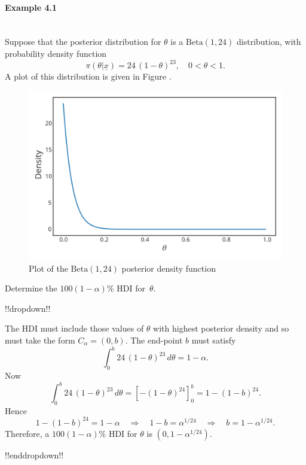 \paragraph{Example 4.1}{~\\
Suppose that the posterior distribution for $\theta$ is a
$\mathrm{Beta}(1,24)$ distribution, with probability density function
$$
\pi(\theta|\underline{x})=24\,(1-\theta)^{23}, \quad 0<\theta<1.
$$
A plot of this distribution is given in Figure .
\begin{figure}[h!]

\includegraphics{images/betaposterior.svg}
\caption{Plot of the $\mathrm{Beta}(1,24)$ posterior density function}


\end{figure}
Determine the $100(1-\alpha)\%$ HDI for~$\theta$.



!!dropdown!!

The HDI must include those values of $\theta$ with highest
    posterior density and so must take the form $C_\alpha=(0,b)$. The
    end-point $b$ must satisfy
    \begin{equation*}
    \int_0^b 24\,(1-\theta)^{23}\,d\theta = 1-\alpha.
    \end{equation*}
    Now
    \begin{equation*}
    \int_0^b 24\,(1-\theta)^{23}\,d\theta 
    = \left[-(1-\theta)^{24}\right]^b_0 = 1-(1-b)^{24}.
    \end{equation*}
    Hence
    $$
    1-(1-b)^{24}=1-\alpha \quad\Longrightarrow \quad 1-b=\alpha^{1/24}
    \quad\Longrightarrow \quad b=1-\alpha^{1/24}.
    $$
    Therefore, a $100(1-\alpha)\%$ HDI for $\theta$ is
    $(0,1-\alpha^{1/24})$.

!!enddropdown!!}



